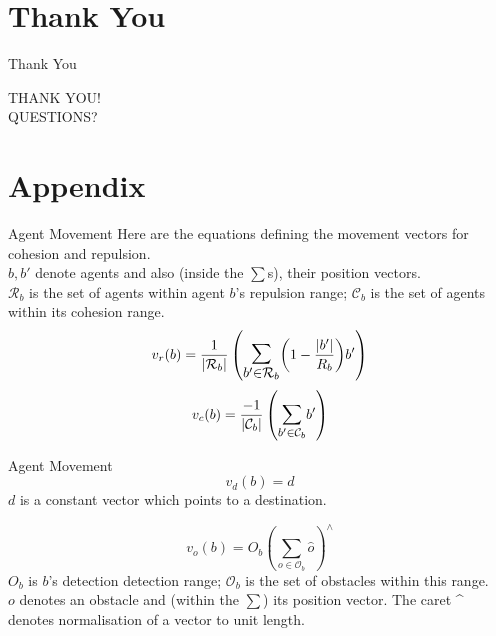 \documentclass{beamer}
\newcommand{\card}[1]{\vert{#1}\vert}
\newcommand{\magn}[1]{\vert{#1}\vert}
\begin{document}
\section*{Thank You}

\begin{frame}{Thank You}
  \begin{center}
  THANK YOU!\\
  QUESTIONS?
  \end{center}
\end{frame}

\section*{Appendix}

\begin{frame}{Agent Movement}
Here are the equations defining the movement vectors for cohesion and repulsion. \\$b, b'$ denote agents and also (inside the $\sum$s), their position vectors. \\$\mathcal R_b$ is the set of agents within agent $b$'s repulsion range; $\mathcal C_b$ is the set of agents within its cohesion range.
  \begin{equation}\label{eq:Repulsion1}
    v_r(b) = 
    \frac{1}{\card{\mathcal R_b}}
    \left(
      \mathlarger{\mathlarger{\sum_{b' \in \mathcal R_b}}}
      {\left( 1-\frac{\magn{b'}}{R_b} \right)}
      b'
    \right)
    \end{equation}
    \begin{equation}\label{eq:FlyToCentre1}
      v_c(b) =
      \frac{-1}{\card{\mathcal C_b}}\left({\mathlarger{\sum_{b' \in
      \mathcal C_b}}{b'}}\right)
    \end{equation}
\end{frame}

\begin{frame}{Agent Movement}
    \begin{equation}\label{eq:Direction}
      v_d(b) = d
    \end{equation}
$d$ is a constant vector which points to a destination.

    \begin{equation}\label{eq:Obstacle2}
      v_o(b) = O_b \left(\sum_{o\in \mathcal O_b }\hat o\right)^{\!\!\wedge}
    \end{equation}
$O_b$ is $b$'s detection detection range; $\mathcal O_b$ is the set of obstacles within this range.\\
$o$ denotes an obstacle and (within the $\sum$) its position vector. The caret \^~ denotes normalisation of a vector to unit length.
\end{frame}
\end{document}
